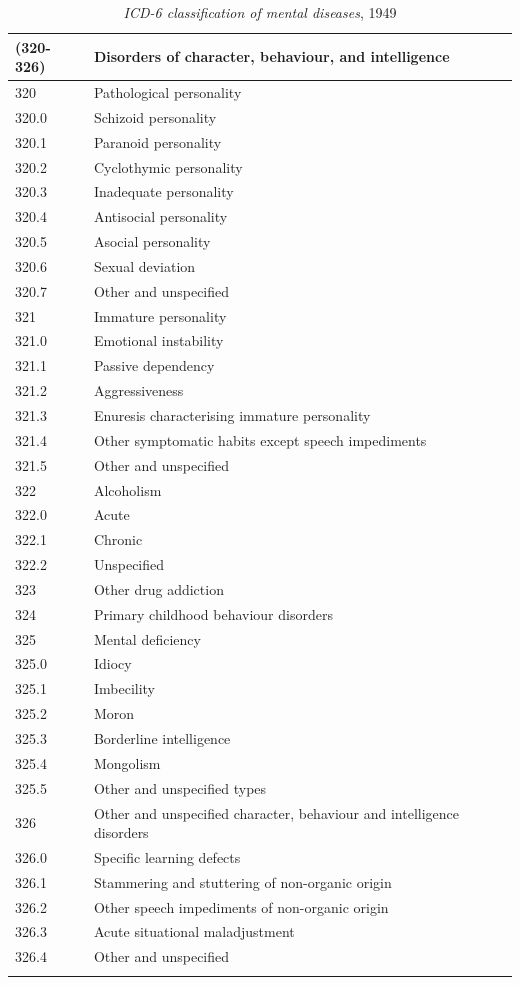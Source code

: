 \begin{longtable}[!t]{ | p{2cm} | p{11.8cm} | }
\textbf{(320-326)}&\textbf{Disorders of character, behaviour, and intelligence}\\ \hline
320&Pathological personality\\
320.0& Schizoid personality\\
320.1& Paranoid personality\\
320.2& Cyclothymic personality\\
320.3& Inadequate personality\\
320.4& Antisocial personality\\
320.5& Asocial personality\\
320.6& Sexual deviation\\
320.7& Other and unspecified\\
321&Immature personality\\
321.0& Emotional instability\\
321.1& Passive dependency\\
321.2& Aggressiveness\\
321.3& Enuresis characterising immature personality\\
321.4& Other symptomatic habits except speech impediments\\
321.5& Other and unspecified\\
322&Alcoholism\\
322.0& Acute\\
322.1& Chronic\\
322.2& Unspecified\\
323&Other drug addiction\\
324&Primary childhood behaviour disorders\\
325&Mental deficiency\\
325.0& Idiocy\\
325.1& Imbecility\\
325.2& Moron\\
325.3& Borderline intelligence\\
325.4& Mongolism\\
325.5& Other and unspecified types\\
326&Other and unspecified character, behaviour and intelligence disorders\\
326.0& Specific learning defects\\
326.1& Stammering and stuttering of non-organic origin\\
326.2& Other speech impediments of non-organic origin\\
326.3& Acute situational maladjustment\\
326.4& Other and unspecified\\ \hline
\caption{\emph{ICD-6 classification of mental diseases}, 1949}
\label{table: 1949Classification}
\end{longtable}


